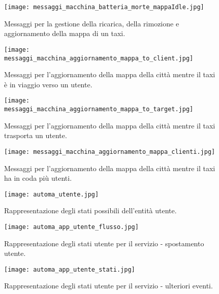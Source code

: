 \begin{figure}[htbp]
	\centering
	\texttt{[image: messaggi\_macchina\_batteria\_morte\_mappaIdle.jpg]}
	\caption{Messaggi per la gestione della ricarica, della rimozione e aggiornamento della mappa di un taxi.}
	\label{fig:messaggi_macchina_batteria_morte_mappaIdle}
\end{figure}

\begin{figure}[htbp]
	\centering
	\texttt{[image: messaggi\_macchina\_aggiornamento\_mappa\_to\_client.jpg]}
	\caption{Messaggi per l'aggiornamento della mappa della città mentre il taxi è in viaggio verso un utente.}
	\label{fig:messaggi_macchina_aggiornamento_mappa_to_client}
\end{figure}

\begin{figure}[htbp]
	\centering
	\texttt{[image: messaggi\_macchina\_aggiornamento\_mappa\_to\_target.jpg]}
	\caption{Messaggi per l'aggiornamento della mappa della città mentre il taxi trasporta un utente.}
	\label{fig:messaggi_macchina_aggiornamento_mappa_to_target}
\end{figure}

\begin{figure}[htbp]
\centering
\texttt{[image: messaggi\_macchina\_aggiornamento\_mappa\_clienti.jpg]}
\caption{Messaggi per l'aggiornamento della mappa della città mentre il taxi ha in coda più utenti.}
\label{fig:messaggi_macchina_aggiornamento_mappa_clienti}
\end{figure}



\begin{figure}[htbp]
	\centering
	\texttt{[image: automa\_utente.jpg]}
	\caption{Rappresentazione degli stati possibili dell'entità utente.}
	\label{fig:automa_utente}
\end{figure}

\begin{figure}[htbp]
	\centering
	\texttt{[image: automa\_app\_utente\_flusso.jpg]}
	\caption{Rappresentazione degli stati utente per il servizio - spostamento utente.}
	\label{fig:automa_app_utente_flusso}
\end{figure}

\begin{figure}[htbp]
	\centering
	\texttt{[image: automa\_app\_utente\_stati.jpg]}
	\caption{Rappresentazione degli stati utente per il servizio - ulteriori eventi.}
	\label{fig:automa_app_utente_stati}
\end{figure}

